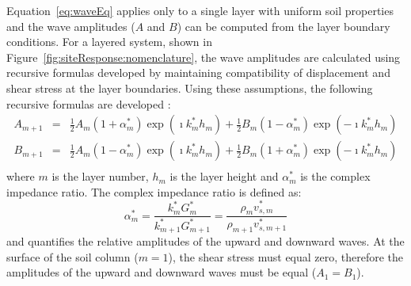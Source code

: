 \documentclass[11pt]{report}
\begin{document}
Equation~\ref{eq:waveEq} applies only to a single layer with uniform soil properties and the
wave amplitudes ($A$ and $B$) can be computed from the layer boundary conditions.  For a layered
system, shown in Figure~\ref{fig:siteResponse:nomenclature}, the wave amplitudes are calculated using
recursive formulas developed by maintaining compatibility of displacement and shear stress at the
layer boundaries.  Using these assumptions, the following recursive formulas are developed
\citep{kramer:96}:
\begin{equation}
  \begin{array}{rcl}
	A_{m+1} & = & \frac{1}{2} A_m \left( 1 + \alpha_m^* \right) \exp\left(\imath k_m^* h_m \right) +
	\frac{1}{2} B_m \left( 1 - \alpha_m^* \right) \exp\left(-\imath k_m^* h_m \right)\\
	B_{m+1} & = & \frac{1}{2} A_m \left( 1 - \alpha_m^* \right) \exp\left(\imath k_m^* h_m\right) +
	\frac{1}{2} B_m \left( 1 + \alpha_m^* \right) \exp\left(-\imath k_m^* h_m \right)\\
  \end{array}
\end{equation}
where $m$ is the layer number, $h_m$ is the layer height and $\alpha_m^*$ is the complex impedance
ratio.  The complex impedance ratio is defined as:
\begin{equation}
  \alpha_m^* = \frac{k_m^* G_m^*}{k_{m+1}^* G_{m+1}^*} = \frac{\rho_m v_{s,m}^* }{\rho_{m+1}
  v_{s,m+1}^* } 
\end{equation}
and quantifies the relative amplitudes of the upward and downward waves.  At the surface of the soil
column ($m=1$), the shear stress must equal zero, therefore the amplitudes of the upward and
downward waves must be equal ($A_1=B_1$).  
\end{document}
